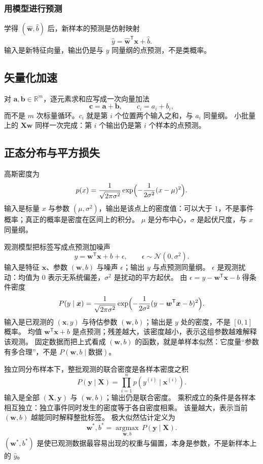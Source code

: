 \subsubsection{用模型进行预测}

学得 $(\hat{\bm{w}},\hat{b})$ 后，新样本的预测是仿射映射
\[
\hat{y}=\hat{\bm{w}}^{\mathsf T}\bm{x}+\hat{b}.
\]
输入是新特征向量，输出仍是与 $y$ 同量纲的点预测，不是类概率。

\subsection{矢量化加速}

对 $\bm{a},\bm{b}\in\mathbb{R}^{m}$，逐元素求和应写成一次向量加法
\[
\bm{c}=\bm{a}+\bm{b},\qquad c_{i}=a_{i}+b_{i},
\]
而不是 $m$ 次标量循环。$c_i$ 就是第 $i$ 个位置两个输入之和，与 $a_i$ 同量纲。
小批量上的 $\bm{X}\bm{w}$ 同样一次完成：第 $i$ 个输出仍是第 $i$ 个样本的点预测。

\subsection{正态分布与平方损失}

高斯密度为
\[
p(x)=\frac{1}{\sqrt{2\pi\sigma^{2}}}
\exp\Bigl(-\frac{1}{2\sigma^{2}}(x-\mu)^{2}\Bigr).
\]
输入是标量 $x$ 与参数 $(\mu,\sigma^{2})$，输出是该点上的密度值：可以大于 $1$，不是事件概率；真正的概率是密度在区间上的积分。
$\mu$ 是分布中心，$\sigma$ 是起伏尺度，与 $x$ 同量纲。

观测模型把标签写成点预测加噪声
\[
y=\bm{w}^{\mathsf T}\bm{x}+b+\epsilon,\qquad
\epsilon\sim\mathcal{N}(0,\sigma^{2}).
\]
输入是特征 $\bm{x}$、参数 $(\bm{w},b)$ 与噪声 $\epsilon$；输出 $y$ 与点预测同量纲。
$\epsilon$ 是观测扰动：均值为 $0$ 表示无系统偏差，$\sigma^{2}$ 是扰动的平方起伏。
由 $\epsilon=y-\bm{w}^{\mathsf T}\bm{x}-b$ 得条件密度
\[
P(y\mid\bm{x})
=
\frac{1}{\sqrt{2\pi\sigma^{2}}}
\exp\Bigl(-\frac{1}{2\sigma^{2}}(y-\bm{w}^{\mathsf T}\bm{x}-b)^{2}\Bigr).
\]
输入是已观测的 $(\bm{x},y)$ 与待估参数 $(\bm{w},b)$；输出是 $y$ 处的密度，不是 $[0,1]$ 概率。
均值 $\bm{w}^{\mathsf T}\bm{x}+b$ 是点预测；残差越大，该密度越小，表示这组参数越难解释该观测。
固定数据而把上式看成 $(\bm{w},b)$ 的函数，就是单样本似然：它度量“参数有多合理”，不是 $P(\bm{w},b\mid\text{数据})$。

独立同分布样本下，整批观测的联合密度是各样本密度之积
\[
P(\bm{y}\mid\bm{X})=\prod_{i=1}^{n}p(y^{(i)}\mid\bm{x}^{(i)}).
\]
输入是全部 $(\bm{X},\bm{y})$ 与 $(\bm{w},b)$；输出仍是联合密度。
乘积成立的条件是各样本相互独立：独立事件同时发生的密度等于各自密度相乘。
该量越大，表示当前 $(\bm{w},b)$ 越能同时解释整批标签。
极大似然估计定义为
\[
\bm{w}^{\ast},b^{\ast}
=
\operatorname*{argmax}_{\bm{w},b}\,
P(\bm{y}\mid\bm{X}).
\]
$(\bm{w}^{\ast},b^{\ast})$ 是使已观测数据最容易出现的权重与偏置，本身是参数，不是新样本上的 $\hat{y}$。

